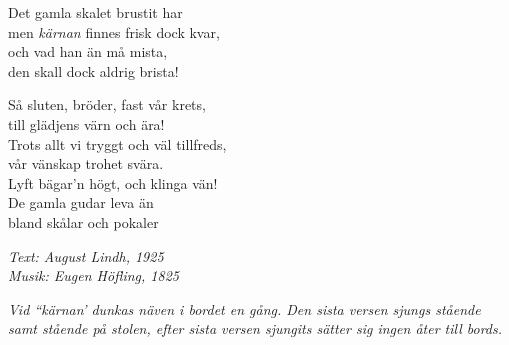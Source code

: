 Det gamla skalet brustit har\\
men \textit{kärnan} finnes frisk dock kvar,\\
och vad han än må mista,\\
den skall dock aldrig brista!\par
\vspace{10pt}
Så sluten, bröder, fast vår krets,\\
till glädjens värn och ära!\\
Trots allt vi tryggt och väl tillfreds,\\
vår vänskap trohet svära.\\
Lyft bägar'n högt, och klinga vän!\\
De gamla gudar leva än\\
\revrpt bland skålar och pokaler\rpt\par
\vspace{10pt}
{\footnotesize\textit{Text: August Lindh, 1925\\ Musik:
Eugen Höfling, 1825}}\par
\vspace{10pt}
{\footnotesize\textit{Vid ``kärnan' dunkas näven i bordet en
gång. Den sista versen sjungs stående samt stående på stolen, efter
sista versen sjungits sätter sig ingen åter till bords.}}
